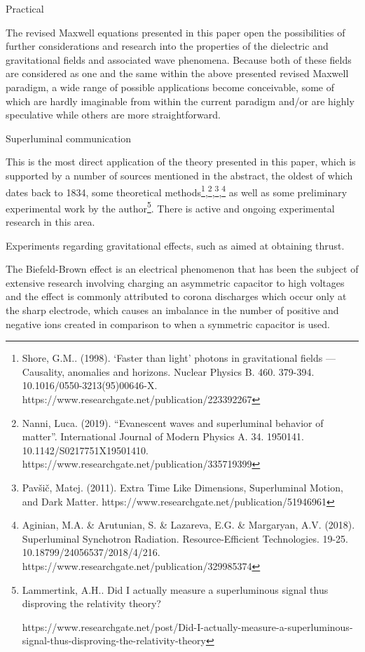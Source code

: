 \documentclass{article}
\begin{document}
Practical

The revised Maxwell equations presented in this paper open the possibilities of further considerations and research into
the properties of the dielectric and gravitational fields and associated wave phenomena. Because both of these fields
are considered as one and the same within the above presented revised Maxwell paradigm, a wide range of possible
applications become conceivable, some of which are hardly imaginable from within the current paradigm and/or are highly
speculative while others are more straightforward.

Superluminal communication

This is the most direct application of the theory presented in this paper, which is supported by a number of sources
mentioned in the abstract, the oldest of which dates back to 1834, some theoretical methods\footnote{ Shore, G.M..
(1998). `Faster than light' photons in gravitational fields --- Causality, anomalies and horizons. Nuclear Physics B.
460. 379-394. 10.1016/0550-3213(95)00646-X. https://www.researchgate.net/publication/223392267 \par },\footnote{ Nanni,
Luca. (2019). ``Evanescent waves and superluminal behavior of matter''. International Journal of Modern Physics A. 34.
1950141. 10.1142/S0217751X19501410. https://www.researchgate.net/publication/335719399 \par },\footnote{
Pav\v{s}i\v{c}, Matej. (2011). Extra Time Like Dimensions, Superluminal Motion, and Dark Matter.
https://www.researchgate.net/publication/51946961 \par },\footnote{ Aginian, M.A. \& Arutunian, S. \& Lazareva, E.G. \&
Margaryan, A.V. (2018). Superluminal Synchotron Radiation. Resource-Efficient Technologies. 19-25.
10.18799/24056537/2018/4/216. https://www.researchgate.net/publication/329985374  \par } as well as some preliminary
experimental work by the author\footnote{ Lammertink, A.H..  Did I actually measure a superluminous signal thus
disproving the relativity theory? \par
https://www.researchgate.net/post/Did-I-actually-measure-a-superluminous-signal-thus-disproving-the-relativity-theory
\par  }. There is active and ongoing experimental research in this area.

Experiments regarding gravitational effects, such as aimed at obtaining thrust.

The Biefeld-Brown effect is an electrical phenomenon that has been the subject of extensive research involving charging
an asymmetric capacitor to high voltages and the effect is commonly attributed to corona discharges which occur only at
the sharp electrode, which causes an imbalance in the number of positive and negative ions created in comparison to
when a symmetric capacitor is used. 
\end{document}
